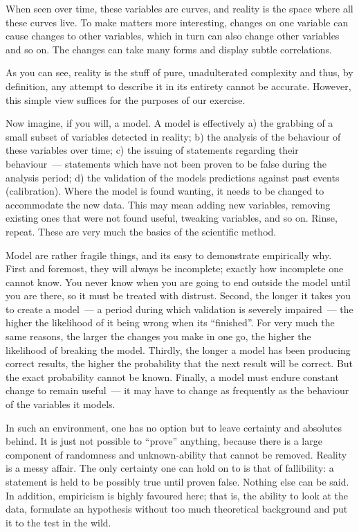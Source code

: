 \documentclass{book}
\begin{document}
When seen over time, these variables are curves, and reality is the
space where all these curves live. To make matters more interesting,
changes on one variable can cause changes to other variables, which in
turn can also change other variables and so on. The changes can take
many forms and display subtle correlations.

As you can see, reality is the stuff of pure, unadulterated complexity
and thus, by definition, any attempt to describe it in its entirety
cannot be accurate. However, this simple view suffices for the
purposes of our exercise.

Now imagine, if you will, a model. A model is effectively a) the
grabbing of a small subset of variables detected in reality; b) the
analysis of the behaviour of these variables over time; c) the issuing
of statements regarding their behaviour~--- statements which have not
been proven to be false during the analysis period; d) the validation
of the models predictions against past events (calibration). Where the
model is found wanting, it needs to be changed to accommodate the new
data. This may mean adding new variables, removing existing ones that
were not found useful, tweaking variables, and so on. Rinse,
repeat. These are very much the basics of the scientific method.

Model are rather fragile things, and its easy to demonstrate
empirically why. First and foremost, they will always be incomplete;
exactly how incomplete one cannot know. You never know when you are
going to end outside the model until you are there, so it must be
treated with distrust. Second, the longer it takes you to create a
model~--- a period during which validation is severely impaired~---
the higher the likelihood of it being wrong when its ``finished''. For
very much the same reasons, the larger the changes you make in one go,
the higher the likelihood of breaking the model. Thirdly, the longer a
model has been producing correct results, the higher the probability
that the next result will be correct. But the exact probability cannot
be known. Finally, a model must endure constant change to remain
useful~--- it may have to change as frequently as the behaviour of the
variables it models.

In such an environment, one has no option but to leave certainty and
absolutes behind. It is just not possible to ``prove'' anything, because
there is a large component of randomness and unknown-ability that
cannot be removed. Reality is a messy affair. The only certainty one
can hold on to is that of fallibility: a statement is held to be
possibly true until proven false. Nothing else can be said. In
addition, empiricism is highly favoured here; that is, the ability to
look at the data, formulate an hypothesis without too much theoretical
background and put it to the test in the wild.
\end{document}
